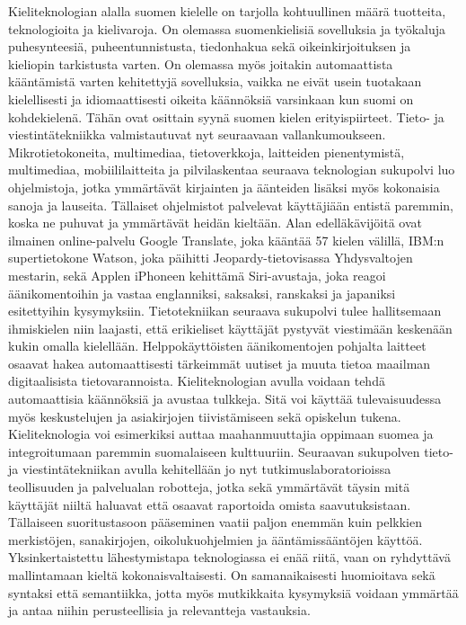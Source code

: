\begin{multicols}{2}
Kieliteknologian alalla suomen kielelle on tarjolla kohtuullinen määrä tuotteita, teknologioita ja kielivaroja. On olemassa suomenkielisiä sovelluksia ja työkaluja puhesynteesiä, puheentunnistusta, tiedonhakua sekä oikeinkirjoituksen ja kieliopin tarkistusta varten. On olemassa myös joitakin automaattista kääntämistä varten kehitettyjä sovelluksia, vaikka ne eivät usein tuotakaan kielellisesti ja idiomaattisesti oikeita käännöksiä varsinkaan kun suomi on kohdekielenä. Tähän ovat osittain syynä suomen kielen erityispiirteet.
Tieto- ja viestintätekniikka valmistautuvat nyt seuraavaan vallankumoukseen.  Mikrotietokoneita, multimediaa, tietoverkkoja, laitteiden pienentymistä, multimediaa, mobiililaitteita ja pilvilaskentaa seuraava teknologian sukupolvi luo ohjelmistoja, jotka ymmärtävät kirjainten ja äänteiden lisäksi myös kokonaisia sanoja ja lauseita. Tällaiset ohjelmistot palvelevat käyttäjiään entistä paremmin, koska ne puhuvat ja ymmärtävät heidän kieltään. Alan edelläkävijöitä ovat ilmainen online-palvelu Google Translate, joka kääntää 57 kielen välillä, IBM:n supertietokone Watson, joka päihitti Jeopardy-tietovisassa Yhdysvaltojen mestarin, sekä Applen iPhoneen kehittämä Siri-avustaja, joka reagoi äänikomentoihin ja vastaa englanniksi, saksaksi, ranskaksi ja japaniksi esitettyihin kysymyksiin.
Tietotekniikan seuraava sukupolvi tulee hallitsemaan ihmiskielen niin laajasti, että erikieliset käyttäjät pystyvät viestimään keskenään kukin omalla kielellään. Helppokäyttöisten äänikomentojen pohjalta laitteet osaavat hakea automaattisesti tärkeimmät uutiset ja muuta tietoa maailman digitaalisista tietovarannoista. Kieliteknologian avulla voidaan tehdä automaattisia käännöksiä ja avustaa tulkkeja. Sitä voi käyttää tulevaisuudessa myös keskustelujen ja asiakirjojen tiivistämiseen sekä opiskelun tukena. Kieliteknologia voi esimerkiksi auttaa maahanmuuttajia oppimaan suomea ja integroitumaan paremmin suomalaiseen kulttuuriin.
Seuraavan sukupolven tieto- ja viestintätekniikan avulla kehitellään jo nyt tutkimuslaboratorioissa teollisuuden ja palvelualan robotteja, jotka sekä ymmärtävät täysin mitä käyttäjät niiltä haluavat että osaavat raportoida omista saavutuksistaan.
Tällaiseen suoritustasoon pääseminen vaatii paljon enemmän kuin pelkkien merkistöjen, sanakirjojen, oikolukuohjelmien ja ääntämissääntöjen käyttöä. Yksinkertaistettu lähestymistapa teknologiassa ei enää riitä, vaan on ryhdyttävä mallintamaan kieltä kokonaisvaltaisesti. On samanaikaisesti huomioitava sekä syntaksi että semantiikka, jotta myös mutkikkaita kysymyksiä voidaan ymmärtää ja antaa niihin perusteellisia ja relevantteja vastauksia.

\end{multicols}
